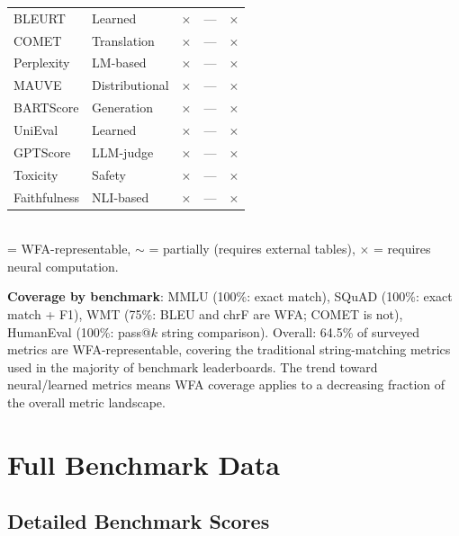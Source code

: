\documentclass[11pt]{article}
\begin{document}
\begin{table}[ht]
\begin{tabular}{@{}llcll@{}}
BLEURT            & Learned       & $\times$   & ---      & $\times$ \\
COMET             & Translation   & $\times$   & ---      & $\times$ \\
Perplexity        & LM-based      & $\times$   & ---      & $\times$ \\
MAUVE             & Distributional& $\times$   & ---      & $\times$ \\
BARTScore         & Generation    & $\times$   & ---      & $\times$ \\
UniEval           & Learned       & $\times$   & ---      & $\times$ \\
GPTScore          & LLM-judge     & $\times$   & ---      & $\times$ \\
Toxicity          & Safety        & $\times$   & ---      & $\times$ \\
Faithfulness      & NLI-based     & $\times$   & ---      & $\times$ \\
\bottomrule
\end{tabular}
\\[4pt]
\footnotesize \checkmark = WFA-representable, $\sim$ = partially (requires external tables),
$\times$ = requires neural computation.
\end{table}

\noindent\textbf{Coverage by benchmark}: MMLU (100\%: exact match),
SQuAD (100\%: exact match + F1), WMT (75\%: BLEU and chrF are WFA;
COMET is not), HumanEval (100\%: pass@$k$ string comparison).
Overall: 64.5\% of surveyed metrics are WFA-representable, covering
the traditional string-matching metrics used in the majority of
benchmark leaderboards.  The trend toward neural/learned metrics means
WFA coverage applies to a decreasing fraction of the overall metric
landscape.


\section{Full Benchmark Data}\label{app:full-benchmark}

\subsection{Detailed Benchmark Scores}
\end{document}
